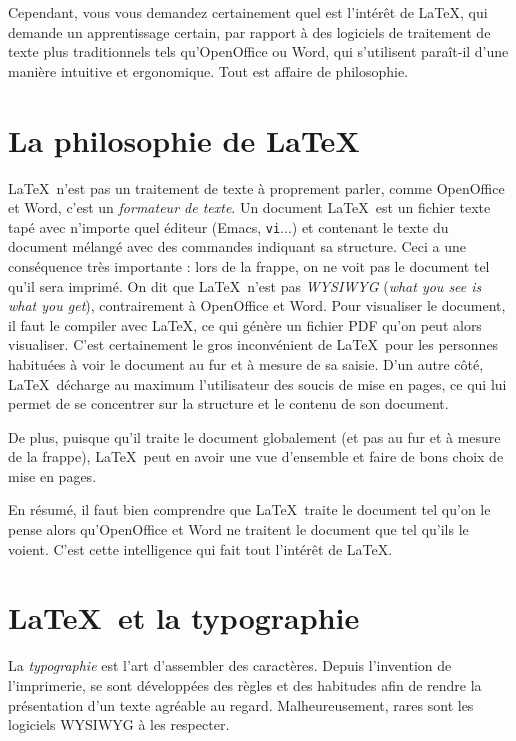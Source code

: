 \documentclass[a4paper,11pt,openbib]{book}
\newcommand{\anglais}[1]{\textit{\foreignlanguage{english}{#1}}}
\newcommand{\terme}[1]{\emph{#1}\index{#1}}
\newcommand{\intercom}[1]{\texttt{#1}}
\begin{document}
Cependant, vous vous demandez certainement quel est l'intérêt de \LaTeX, qui
demande un apprentissage certain, par rapport à des logiciels de traitement de
texte plus traditionnels tels qu'OpenOffice ou Word, qui s'utilisent paraît-il
d'une manière intuitive et ergonomique. Tout est affaire de philosophie.

\section{La philosophie de \LaTeX}

\LaTeX\ n'est pas un traitement de texte à proprement parler, comme OpenOffice
et Word, c'est un \emph{formateur de texte}. Un document \LaTeX\ est un fichier
texte tapé avec n'importe quel éditeur (Emacs, \intercom{vi}...) et contenant le
texte du document mélangé avec des commandes indiquant sa structure. Ceci a une
conséquence très importante : lors de la frappe, on ne voit pas le document tel
qu'il sera imprimé. On dit que \LaTeX\ n'est pas \terme{WYSIWYG} (\anglais{what
you see is what you get}), contrairement à OpenOffice et Word. Pour visualiser
le document, il faut le compiler avec \LaTeX, ce qui génère un fichier
PDF qu'on peut alors visualiser. C'est certainement le gros
inconvénient de \LaTeX\ pour les personnes habituées à voir le document au fur
et à mesure de sa saisie. D'un autre côté, \LaTeX\ décharge au maximum
l'utilisateur des soucis de mise en pages, ce qui lui permet de se concentrer
sur la structure et le contenu de son document.

De plus, puisque qu'il traite le document globalement (et pas au fur et à mesure
de la frappe), \LaTeX\ peut en avoir une vue d'ensemble et faire de bons choix
de mise en pages.

En résumé, il faut bien comprendre que \LaTeX\ traite le document tel qu'on le
pense alors qu'OpenOffice et Word ne traitent le document que tel qu'ils le
voient. C'est cette intelligence qui fait tout l'intérêt de \LaTeX.

\section{\LaTeX\ et la typographie}

La \terme{typographie} est l'art d'assembler des caractères. Depuis l'invention
de l'imprimerie, se sont développées des règles et des habitudes afin de rendre
la présentation d'un texte agréable au regard. Malheureusement, rares sont les
logiciels WYSIWYG à les respecter.
\end{document}
